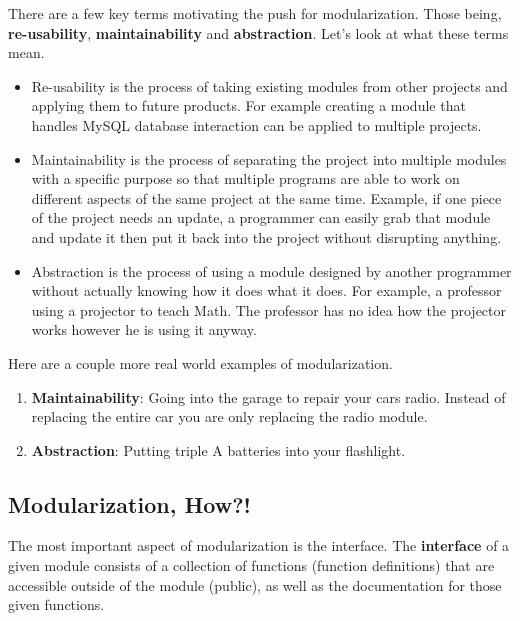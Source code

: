 \documentclass[12pt,extarticle]{article}
\begin{document}
There are a few key terms motivating the push for modularization. Those being, \textbf{re-usability}, \textbf{maintainability} and \textbf{abstraction}. Let's look at what these terms mean.

\begin{itemize}

\item Re-usability is the process of taking existing modules from other projects and applying them to future products. For example creating a module that handles MySQL database interaction can be applied to multiple projects.

\item Maintainability is the process of separating the project into multiple modules with a specific purpose so that multiple programs are able to work on different aspects of the same project at the same time. Example, if one piece of the project needs an update, a programmer can easily grab that module and update it then put it back into the project without disrupting anything.

\item Abstraction is the process of using a module designed by another programmer without actually knowing how it does what it does. For example, a professor using a projector to teach Math. The professor has no idea how the projector works however he is using it anyway.

\end{itemize}

Here are a couple more real world examples of modularization.

\begin{enumerate}

\item \textbf{Maintainability}: Going into the garage to repair your cars radio. Instead of replacing the entire car you are only replacing the radio module.

\item \textbf{Abstraction}: Putting triple A batteries into your flashlight.

\end{enumerate}

\subsection{Modularization, How?!}

The most important aspect of modularization is the interface. The \textbf{interface} of a given module consists of a collection of functions (function definitions) that are accessible outside of the module (public), as well as the documentation for those given functions.\\
\end{document}
